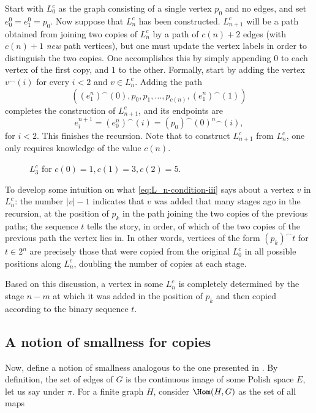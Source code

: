 Start with $L^c_0$ as the graph consisting of a single vertex $p_0$ and no edges, and set $e^0_0=e^0_1=p_0$.
Now suppose that $L^c_n$ has been constructed.
$L^c_{n+1}$ will be a path obtained from joining two copies of $L^c_n$ by a path of $c(n)+2$ edges (with $c(n)+1$ \emph{new} path vertices), but one must update the vertex labels in order to distinguish the two copies.
One accomplishes this by simply appending $0$ to each vertex of the first copy, and $1$ to the other.
Formally, start by adding the vertex $v^\frown(i)$ for every $i<2$ and $v\in L^c_n$.
Adding the path $$((e_1^n)^\smallfrown(0),p_0,p_1,\dots,p_{c(n)},(e_1^n)^\smallfrown(1))$$ completes the construction of $L^c_{n+1}$, and its endpoints are $$e_i^{n+1}=(e_0^n)^\smallfrown(i)=(p_0)^\smallfrown(0)^n{}^\smallfrown(i),$$ for $i<2$.
This finishes the recursion.
Note that to construct $L^c_{n+1}$ from $L^c_n$, one only requires knowledge of the value $c(n)$.

\begin{figure}[ht]
    \centering
    
    \caption{$L_3^c$ for $c(0)=1,c(1)=3,c(2)=5$.}
    \label{fig:L_n}
\end{figure}

To develop some intuition on what \eqref{eq:L_n-condition-iii} says about a vertex $v$ in $L^c_n$: the number $|v|-1$ indicates that $v$ was added that many stages ago in the recursion, at the position of $p_k$ in the path joining the two copies of the previous paths; the sequence $t$ tells the story, in order, of which of the two copies of the previous path the vertex lies in.
In other words, vertices of the form $(p_k)^\smallfrown t$ for $t\in 2^n$ are precisely those that were copied from the original $L^c_0$ in all possible positions along $L^c_n$, doubling the number of copies at each stage.

Based on this discussion, a vertex in some $L^c_n$ is completely determined by the stage $n-m$ at which it was added in the position of $p_k$ and then copied according to the binary sequence $t$.

\subsection{A notion of smallness for copies}\label{sec:notion-smallness}

Now, define a notion of smallness analogous to the one presented in \cite{Bernshteyn2024}.
By definition, the set of edges of $G$ is the continuous image of some Polish space $E$, let us say under $\pi$.
For a finite graph $H$, consider $\Hom(H,G)$ as the set of all maps


